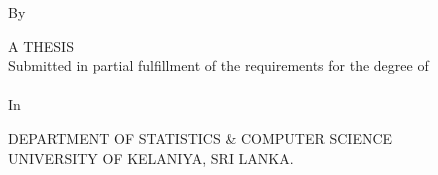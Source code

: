 


\begin{titlepage}
  \begin{center}
    \vspace*{0.5cm}

    \textbf{\thesisTitle}

    \vspace{0.9cm}

    By\\[1\baselineskip]
    \thesisAuthor{}

    \vfill
    \begin{onehalfspace}
        A THESIS\\
        Submitted in partial fulfillment of the requirements for the degree of\\
        \degreeProgramme{}\\
        In \degreeSpecialization
    \end{onehalfspace}

    \vspace{9.4cm}

    DEPARTMENT OF STATISTICS \& COMPUTER SCIENCE\\
    UNIVERSITY OF KELANIYA, SRI LANKA.\\
    \thesisYear{}

    \vspace*{0.5cm}

  \end{center}
\end{titlepage}
